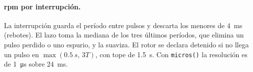 \paragraph{rpm por interrupción.} La interrupción guarda el período entre pulsos y descarta
los menores de \SI{4}{ms} (rebotes). El lazo toma la mediana de los tres últimos períodos,
que elimina un pulso perdido o uno espurio, y la suaviza. El rotor se declara detenido si no
llega un pulso en $\max(\SI{0.5}{s},\,3T)$, con tope de \SI{1.5}{s}. Con
\texttt{micros()} la resolución es de \SI{1}{\micro s} sobre \SI{24}{ms}.





